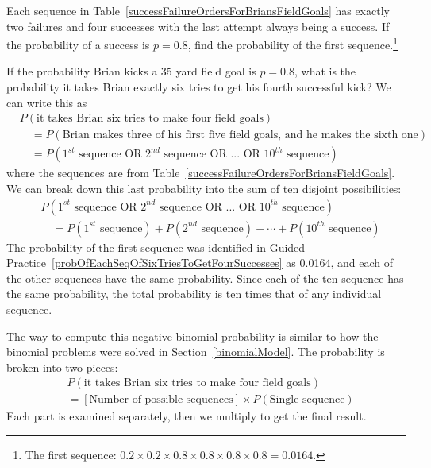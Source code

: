 \begin{exercise} \label{probOfEachSeqOfSixTriesToGetFourSuccesses}
Each sequence in Table~\ref{successFailureOrdersForBriansFieldGoals} has exactly two failures and four successes with the last attempt always being a success. If the probability of a success is $p=0.8$, find the probability of the first sequence.\footnote{The first sequence: $0.2\times0.2\times0.8\times0.8\times0.8\times0.8 = 0.0164$.}
\end{exercise}

If the probability Brian kicks a 35 yard field goal is $p=0.8$, what is the probability it takes Brian exactly six tries to get his fourth successful kick? We can write this as
{\small\begin{align*}
&P(\text{it takes Brian six tries to make four field goals}) \\
& \quad = P(\text{Brian makes three of his first five field goals, and he makes the sixth one}) \\
& \quad = P(\text{$1^{st}$ sequence OR $2^{nd}$ sequence OR ... OR $10^{th}$ sequence})
\end{align*}
}where the sequences are from Table~\ref{successFailureOrdersForBriansFieldGoals}. We can break down this last probability into the sum of ten disjoint possibilities:
{\small\begin{align*}
&P(\text{$1^{st}$ sequence OR $2^{nd}$ sequence OR ... OR $10^{th}$ sequence}) \\
&\quad = P(\text{$1^{st}$ sequence}) + P(\text{$2^{nd}$ sequence}) + \cdots + P(\text{$10^{th}$ sequence})
\end{align*}
}The probability of the first sequence was identified in Guided Practice~\ref{probOfEachSeqOfSixTriesToGetFourSuccesses} as 0.0164, and each of the other sequences have the same probability. Since each of the ten sequence has the same probability, the total probability is ten times that of any individual sequence.

The way to compute this negative binomial probability is similar to how the binomial problems were solved in Section~\ref{binomialModel}. The probability is broken into two pieces:
\begin{align*}
&P(\text{it takes Brian six tries to make four field goals}) \\
&= [\text{Number of possible sequences}] \times P(\text{Single sequence})
\end{align*}
Each part is examined separately, then we multiply to get the final result.


